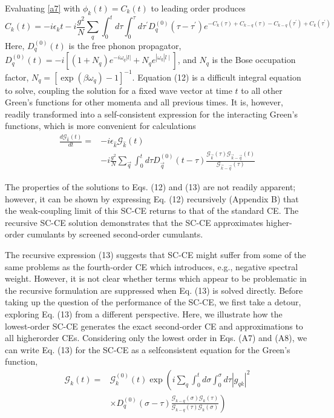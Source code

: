 Evaluating \ref{a7} with $\phi_k(t)=C_k(t)$ to leading order produces
\begin{equation}
    C_k(t)=-i \epsilon_k t - i \frac{g^2}{N}\sum_q \int_0^t d \tau \int_0^\tau d \tau^{\prime} D_q^{(0)}\left(\tau-\tau^{\prime}\right) e^{-C_k(\tau)+C_{k-q}(\tau)-C_{k-q}\left(\tau^{\prime}\right)+C_k\left(\tau^{\prime}\right)}
\end{equation}
Here, $D_q^{(0)}(t)$ is the free phonon propagator, $D_q^{(0)}(t)= -i\left[\left(1+N_q\right) e^{-i \omega_q|l|}+N_q e^{\left|\omega_q\right| l \mid}\right]$, and $N_q$ is the Bose occupation factor, $N_q=\left[\exp \left(\beta \omega_q\right)-1\right]^{-1}$. Equation (12) is a difficult integral equation to solve, coupling the solution for a fixed wave vector at time $t$ to all other Green's functions for other momenta and all previous times. It is, however, readily transformed into a self-consistent expression for the interacting Green's functions, which is more convenient for calculations
$$
\begin{aligned}
\frac{d \mathcal{G}_{\hat{k}}(t)}{d t}= & -i \epsilon_{\hat{k}} \mathcal{G}_{\hat{k}}(t) \\
& -i \frac{g^2}{N} \sum_{\vec{q}} \int_0^t d \tau D_{\vec{q}}^{(0)}(t-\tau) \frac{\mathcal{G}_{\vec{k}}(\tau) \mathcal{G}_{\vec{k}-\vec{q}}(t)}{\mathcal{G}_{\vec{k}-\vec{q}}(\tau)}
\end{aligned}
$$

The properties of the solutions to Eqs. (12) and (13) are not readily apparent; however, it can be shown by expressing Eq. (12) recursively (Appendix B) that the weak-coupling limit of this SC-CE returns to that of the standard CE. The recursive SC-CE solution demonstrates that the SC-CE approximates higher-order cumulants by screened second-order cumulants.

The recursive expression (13) suggests that SC-CE might suffer from some of the same problems as the fourth-order CE which introduces, e.g., negative spectral weight. However, it is not clear whether terms which appear to be problematic in the recursive formulation are suppressed when Eq. (13) is solved directly. Before taking up the question of the performance of the SC-CE, we first take a detour, exploring Eq. (13) from a different perspective.
Here, we illustrate how the lowest-order SC-CE generates the exact second-order CE and approximations to all higherorder CEs. Considering only the lowest order in Eqs. (A7) and (A8), we can write Eq. (13) for the SC-CE as a selfconsistent equation for the Green's function,
$$
\begin{aligned}
\mathcal{G}_k(t)= & \mathcal{G}_k^{(0)}(t) \exp \left(i \sum_q \int_0^t d \sigma \int_0^\sigma d \tau\left|g_{q k}\right|^2\right. \\
& \left.\times D_q^{(0)}(\sigma-\tau) \frac{\mathcal{G}_{k-q}(\sigma) \mathcal{G}_k(\tau)}{\mathcal{G}_{k-q}(\tau) \mathcal{G}_k(\sigma)}\right)
\end{aligned}
$$

